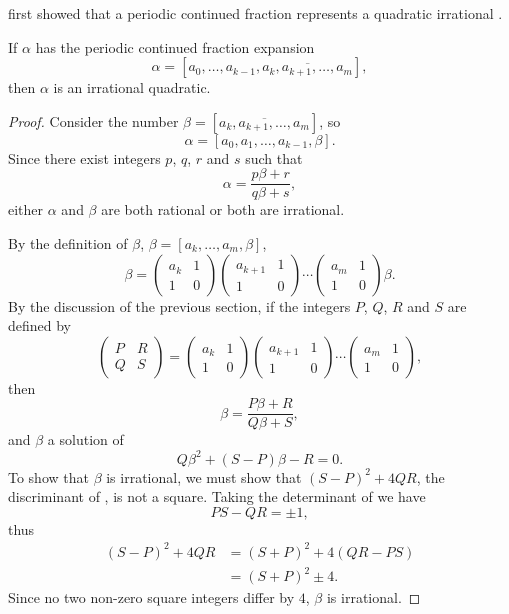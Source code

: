 {\Euler} first showed that a periodic continued fraction represents a
quadratic irrational \cite{Euler1737-nl}.

\begin{proposition}[Euler] \label{Euler:Periodic:Quad:Prop}
If $\alpha$ has the periodic continued fraction expansion
\[
\alpha = [a_0, \ldots, a_{k-1}, \overline{a_k, a_{k+1}, \ldots, a_m}],
\]
then $\alpha$ is an irrational quadratic.
\end{proposition}

\begin{proof}
Consider the number $\beta = [\overline{a_k, a_{k+1}, \ldots, a_m}]$,
so 
\[
\alpha = [a_0, a_1, \ldots, a_{k-1}, \beta].
\]
Since there exist integers $p$, $q$, $r$ and $s$ such that
\[
\alpha = \frac{p\beta + r}{q\beta + s},
\]
either $\alpha$ and $\beta$ are both rational or both are irrational.

By the definition of $\beta$, $\beta = [a_k, \ldots, a_m, \beta]$, \ie
\[
\beta = 
  \left(\begin{array}{cc}a_k& 1\\ 1 & 0\end{array}\right) 
\left(\begin{array}{cc}a_{k+1}& 1\\ 1 & 0\end{array}\right) 
  \cdots
\left(\begin{array}{cc}a_m& 1\\ 1 & 0\end{array}\right) \beta.
\]
By the discussion of the previous section, if the integers $P$, $Q$,
$R$ and $S$ are defined by
\begin{equation}\label{CF:Periodic:1:Eq}
\left(\begin{array}{cc}P& R\\ Q & S\end{array}\right) = 
\left(\begin{array}{cc}a_k& 1\\ 1 & 0\end{array}\right) 
\left(\begin{array}{cc}a_{k+1}& 1\\ 1 & 0\end{array}\right) 
  \cdots
\left(\begin{array}{cc}a_m& 1\\ 1 & 0\end{array}\right),
\end{equation}
then 
\[
\beta = \frac{P\beta + R}{Q \beta + S},
\]
and $\beta$ a solution of 
\begin{equation}\label{CF:Periodic:2:Eq}
Q\beta^2 + (S - P) \beta - R = 0.
\end{equation}
To show that $\beta$ is irrational, we must show that $(S - P)^2 +
4QR$, the discriminant of , is not a square.
Taking the determinant of  we have
\[
PS - QR = \pm 1,
\]
thus
\[
\begin {aligned}
  (S-P)^2 + 4QR & = (S+P)^2 + 4 (QR - PS) \\
   & = (S+P)^2 \pm 4.
\end{aligned}
\]
Since no two non-zero square integers differ by $4$, $\beta$ is irrational.
\end{proof}

